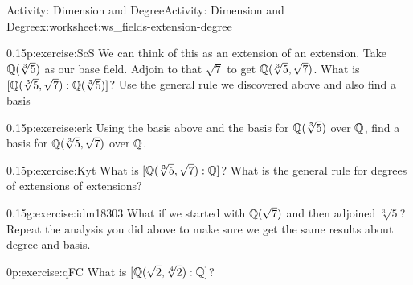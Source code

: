 \documentclass[11pt]{book}
\begin{document}
\begin{worksheet-subsection}{Activity: Dimension and Degree}{}{Activity: Dimension and Degree}{}{}{x:worksheet:ws_fields-extension-degree}
\begin{divisionexercise}{6}{}{0.15}{p:exercise:ScS}%
We can think of this as an extension of an extension.  Take \(\mathbb{Q}(\sqrt[3]{5})\) as our base field.  Adjoin to that \(\sqrt{7}\) to get \(\mathbb{Q}(\sqrt[3]{5}, \sqrt{7})\). What is \([\mathbb{Q}(\sqrt[3]{5}, \sqrt{7}):\mathbb{Q}(\sqrt[3]{5})]\)?  Use the general rule we discovered above and also find a basis%
\end{divisionexercise}%
\begin{divisionexercise}{7}{}{0.15}{p:exercise:erk}%
Using the basis above and the basis for \(\mathbb{Q}(\sqrt[3]{5})\) over \(\mathbb{Q}\), find a basis for \(\mathbb{Q}(\sqrt[3]{5}, \sqrt{7})\) over \(\mathbb{Q}\).%
\end{divisionexercise}%
\begin{divisionexercise}{8}{}{0.15}{p:exercise:Kyt}%
What is \([\mathbb{Q}(\sqrt[3]{5}, \sqrt{7}):\mathbb{Q}]\)?  What is the general rule for degrees of extensions of extensions?%
\end{divisionexercise}%
\begin{divisionexercise}{9}{}{0.15}{g:exercise:idm18303}%
What if we started with \(\mathbb{Q}(\sqrt{7})\) and then adjoined \(\sqrt[3]{5}\)?  Repeat the analysis you did above to make sure we get the same results about degree and basis.%
\end{divisionexercise}%
\begin{divisionexercise}{10}{}{0}{p:exercise:qFC}%
What is \([\mathbb{Q}(\sqrt{2}, \sqrt[4]{2}):\mathbb{Q}]\)?%
\end{divisionexercise}%
\end{worksheet-subsection}
\restoregeometry
\end{document}
